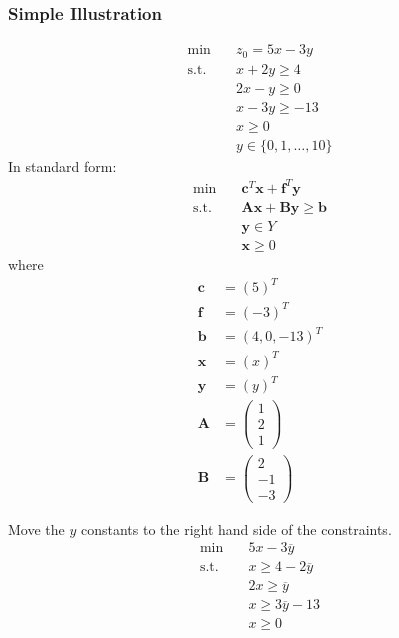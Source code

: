 \documentclass[fleqn,10pt]{wlscirep}
\begin{document}
\subsubsection{Simple Illustration}

\begin{align}
    \min \quad& z_0 = 5 x - 3 y \\
    \text{s.t.} \quad& x + 2 y \geq 4 \\ 
    & 2 x - y \geq 0 \\ 
    & x - 3 y \geq - 13 \\ 
    & x \geq 0 \\ 
    & y \in \{ 0,1 , \ldots , 10 \}
\end{align}
In standard form:
\begin{align}
    \min \quad& \mathbf{c} ^ { T } \mathbf{x} + \mathbf{f} ^ { T } \mathbf{y} \label{eq:1} \\
    \text{s.t.} \quad& \mathbf{A} \mathbf{x} + \mathbf{B} \mathbf{y} \geq \mathbf{b} \label{eq:2} \\ 
    & \mathbf{y} \in Y \label{eq:3} \\ 
    & \mathbf{x} \geq 0 \label{eq:4} 
\end{align}
where 
\begin{align}
	\mathbf{c} &= (5)^T \\
    \mathbf{f} &= (-3)^T \\
    \mathbf{b} &= (4, 0, -13)^T \\
    \mathbf{x} &= (x)^T \\
    \mathbf{y} &= (y)^T \\
    \mathbf{A} &= \left(\begin{array}{c}
    	1 \\
        2 \\
        1
    \end{array} \right) \\
    \mathbf{B} &= \left(\begin{array}{c}
    	2 \\
        -1 \\
        -3
    \end{array} \right)
\end{align}

Move the $y$ constants to the right hand side of the constraints.
\begin{align}
    \min \quad& 5 x - 3 \overline{y} \\
    \text{s.t.} \quad& x \geq 4 - 2 \overline{y} \\ 
    & 2 x \geq \overline{y} \\ 
    & x \geq 3 \overline{y} - 13 \\ 
    & x \geq 0
\end{align}
\end{document}

